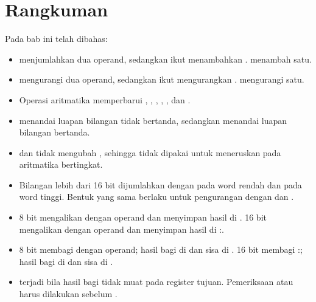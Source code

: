 \section{Rangkuman}
\label{sec:rangkuman-bab10}

Pada bab ini telah dibahas:

\begin{itemize}
    \item {} menjumlahkan dua operand, sedangkan 
          ikut menambahkan .  menambah satu.

    \item {} mengurangi dua operand, sedangkan 
          ikut mengurangkan .  mengurangi satu.

    \item Operasi aritmatika memperbarui , ,
          , , , dan .

    \item {} menandai luapan bilangan tidak bertanda,
          sedangkan  menandai luapan bilangan bertanda.

    \item {} dan  tidak mengubah , sehingga
          tidak dipakai untuk meneruskan  pada
          aritmatika bertingkat.

    \item Bilangan lebih dari 16 bit dijumlahkan dengan 
          pada word rendah dan  pada word tinggi. Bentuk
          yang sama berlaku untuk pengurangan dengan  dan
          .

    \item {} 8 bit mengalikan  dengan operand dan
          menyimpan hasil di .  16 bit mengalikan
           dengan operand dan menyimpan hasil di
          :.

    \item {} 8 bit membagi  dengan operand; hasil
          bagi di  dan sisa di .  16 bit
          membagi :; hasil bagi di  dan
          sisa di .

    \item {} terjadi bila hasil bagi tidak muat
          pada register tujuan. Pemeriksaan  atau 
          harus dilakukan sebelum .
\end{itemize}

